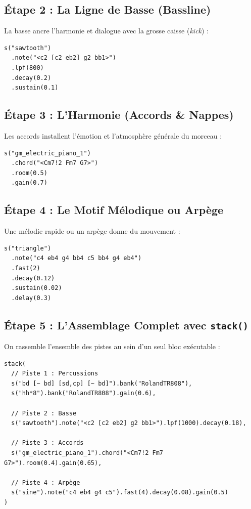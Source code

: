 \documentclass[a4paper,10pt]{article}
\begin{document}
\subsection{Étape 2 : La Ligne de Basse (Bassline)}
La basse ancre l'harmonie et dialogue avec la grosse caisse (\textit{kick}) :
\begin{verbatim}
s("sawtooth")
  .note("<c2 [c2 eb2] g2 bb1>")
  .lpf(800)
  .decay(0.2)
  .sustain(0.1)
\end{verbatim}

\subsection{Étape 3 : L'Harmonie (Accords \& Nappes)}
Les accords installent l'émotion et l'atmosphère générale du morceau :
\begin{verbatim}
s("gm_electric_piano_1")
  .chord("<Cm7!2 Fm7 G7>")
  .room(0.5)
  .gain(0.7)
\end{verbatim}

\subsection{Étape 4 : Le Motif Mélodique ou Arpège}
Une mélodie rapide ou un arpège donne du mouvement :
\begin{verbatim}
s("triangle")
  .note("c4 eb4 g4 bb4 c5 bb4 g4 eb4")
  .fast(2)
  .decay(0.12)
  .sustain(0.02)
  .delay(0.3)
\end{verbatim}

\subsection{Étape 5 : L'Assemblage Complet avec \texttt{stack()}}
On rassemble l'ensemble des pistes au sein d'un seul bloc exécutable :
\begin{verbatim}
stack(
  // Piste 1 : Percussions
  s("bd [~ bd] [sd,cp] [~ bd]").bank("RolandTR808"),
  s("hh*8").bank("RolandTR808").gain(0.6),

  // Piste 2 : Basse
  s("sawtooth").note("<c2 [c2 eb2] g2 bb1>").lpf(1000).decay(0.18),

  // Piste 3 : Accords
  s("gm_electric_piano_1").chord("<Cm7!2 Fm7 G7>").room(0.4).gain(0.65),

  // Piste 4 : Arpège
  s("sine").note("c4 eb4 g4 c5").fast(4).decay(0.08).gain(0.5)
)
\end{verbatim}

\newpage
\end{document}
